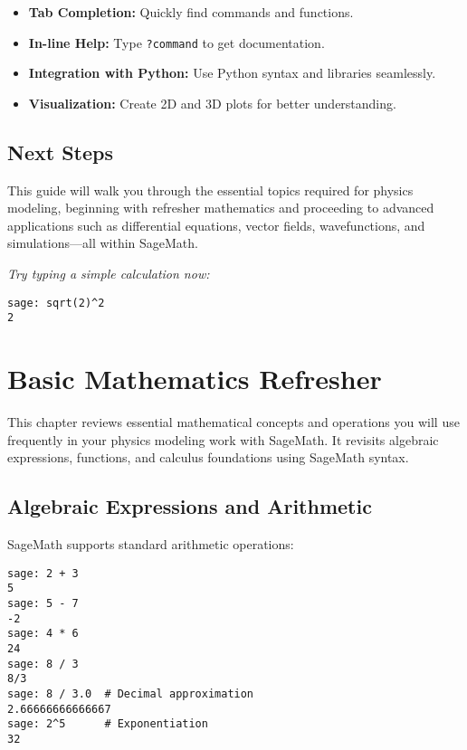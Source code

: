 \documentclass[12pt]{book}
\begin{document}
\begin{itemize}
  \item \textbf{Tab Completion:} Quickly find commands and functions.
  \item \textbf{In-line Help:} Type \texttt{?command} to get documentation.
  \item \textbf{Integration with Python:} Use Python syntax and libraries seamlessly.
  \item \textbf{Visualization:} Create 2D and 3D plots for better understanding.
\end{itemize}

\section{Next Steps}

This guide will walk you through the essential topics required for physics modeling, beginning with refresher mathematics and proceeding to advanced applications such as differential equations, vector fields, wavefunctions, and simulations—all within SageMath.

\vspace{6pt}
\textit{Try typing a simple calculation now:}

\begin{verbatim}
sage: sqrt(2)^2
2
\end{verbatim}

\chapter{Basic Mathematics Refresher}

This chapter reviews essential mathematical concepts and operations you will use frequently in your physics modeling work with SageMath. It revisits algebraic expressions, functions, and calculus foundations using SageMath syntax.

\section{Algebraic Expressions and Arithmetic}

SageMath supports standard arithmetic operations:

\begin{verbatim}
sage: 2 + 3
5
sage: 5 - 7
-2
sage: 4 * 6
24
sage: 8 / 3
8/3
sage: 8 / 3.0  # Decimal approximation
2.66666666666667
sage: 2^5      # Exponentiation
32
\end{verbatim}
\end{document}
